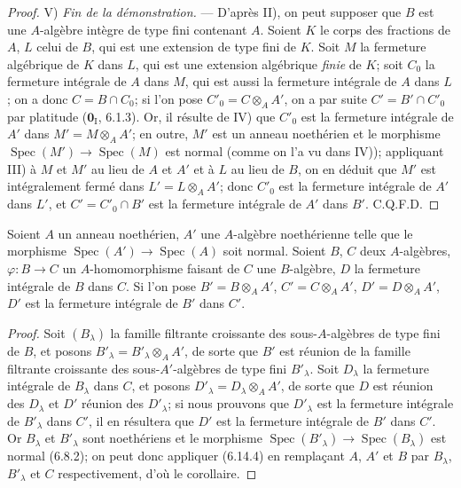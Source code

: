 \begin{proof}
V) \emph{Fin de la démonstration.} --- D'après II), on peut supposer que
$B$ est une $A$-algèbre intègre de type fini contenant $A$. Soient $K$ le
corps des fractions de $A$, $L$ celui de $B$, qui est une extension de type
fini de $K$. Soit $M$ la fermeture algébrique de $K$ dans $L$, qui est une
extension algébrique \emph{finie} de $K$; soit $C_0$ la fermeture intégrale de $A$
dans $M$, qui est aussi la fermeture intégrale de $A$ dans $L$; on a donc
$C=B\cap C_0$; si l'on pose $C'_0=C\otimes_A A'$, on a par suite
$C'=B'\cap C'_0$ par platitude ($\mathbf{0}_{\mathrm I}$, 6.1.3). Or, il résulte de
IV) que $C'_0$ est la fermeture intégrale de $A'$ dans
$M'=M\otimes_A A'$; en outre, $M'$ est un anneau noethérien et le morphisme
$\operatorname{Spec}(M')\to\operatorname{Spec}(M)$ est normal (comme on
l'a vu dans IV)); appliquant III) à $M$ et $M'$ au lieu de $A$ et $A'$ et
à $L$ au lieu de $B$, on en déduit que $M'$ est intégralement fermé dans
$L'=L\otimes_A A'$; donc $C'_0$ est la fermeture intégrale de $A'$ dans
$L'$, et $C'=C'_0\cap B'$ est la fermeture intégrale de $A'$ dans $B'$.
C.Q.F.D.
\end{proof}

\begin{corollary}[6.14.5]
\label{IV.2.s6.14.5-fr}
Soient $A$ un anneau noethérien, $A'$ une $A$-algèbre noethérienne telle
que le morphisme $\operatorname{Spec}(A')\to\operatorname{Spec}(A)$ soit
normal. Soient $B$, $C$ deux $A$-algèbres,
$\varphi:B\to C$ un $A$-homomorphisme faisant de $C$ une $B$-algèbre, $D$
la fermeture intégrale de $B$ dans $C$. Si l'on pose
$B'=B\otimes_A A'$, $C'=C\otimes_A A'$, $D'=D\otimes_A A'$, $D'$ est la
fermeture intégrale de $B'$ dans $C'$.
\end{corollary}

\begin{proof}
Soit $(B_\lambda)$ la famille filtrante croissante des sous-$A$-algèbres
de type fini de $B$, et posons $B'_\lambda=B'_\lambda\otimes_A A'$, de
sorte que $B'$ est réunion de la famille filtrante croissante des
sous-$A'$-algèbres de type fini $B'_\lambda$. Soit $D_\lambda$ la
fermeture intégrale de $B_\lambda$ dans $C$, et posons
$D'_\lambda=D_\lambda\otimes_A A'$, de sorte que $D$ est réunion des
$D_\lambda$ et $D'$ réunion des $D'_\lambda$; si nous prouvons que
$D'_\lambda$ est la fermeture intégrale de $B'_\lambda$ dans $C'$, il en
résultera que $D'$ est la fermeture intégrale de $B'$ dans $C'$. Or
$B_\lambda$ et $B'_\lambda$ sont noethériens et le morphisme
$\operatorname{Spec}(B'_\lambda)\to\operatorname{Spec}(B_\lambda)$ est
normal (6.8.2); on peut donc appliquer (6.14.4) en remplaçant $A$, $A'$ et
$B$ par $B_\lambda$, $B'_\lambda$ et $C$ respectivement, d'où le
corollaire.
\end{proof}

